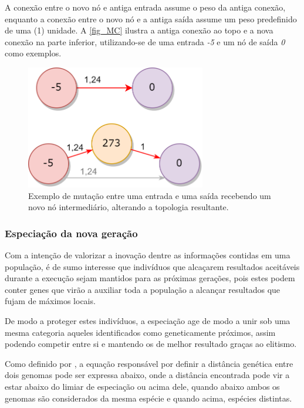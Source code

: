A conexão entre o novo nó e antiga entrada assume o peso da antiga conexão, enquanto a
conexão entre o novo nó e a antiga saída assume um peso predefinido de uma (1) unidade.
A \autoref{fig_MC} ilustra a antiga conexão ao topo e a nova conexão na parte inferior,
utilizando-se de uma entrada \textit{-5} e um nó de saída \textit{0} como exemplos.

\begin{figure}[htb]
        \centering
        \caption{\label{fig_MC}Exemplo de mutação entre uma entrada e uma saída recebendo um novo nó intermediário, alterando a topologia resultante.}
        \includegraphics[width=0.7\textwidth]{images/MC.png}
\end{figure}

\subsubsection{Especiação da nova geração}
Com a intenção de valorizar a inovação dentre as informações contidas em uma população, é de sumo interesse
que indivíduos que alcaçarem resultados aceitáveis durante a execução sejam mantidos para as próximas gerações,
pois estes podem conter genes que virão a auxiliar toda a população a alcançar resultados que fujam de máximos locais.

De modo a proteger estes indivíduos, a especiação age de modo a unir sob uma mesma categoria aqueles
identificados como geneticamente próximos, assim podendo competir entre si e mantendo os de melhor resultado graças ao elitismo.

Como definido por , a equação responsável por definir a
distância genética entre dois genomas pode ser expressa abaixo, onde a distância  encontrada
pode vir a estar abaixo do limiar de especiação ou acima dele, quando abaixo ambos os genomas
são considerados da mesma espécie e quando acima, espécies distintas.

